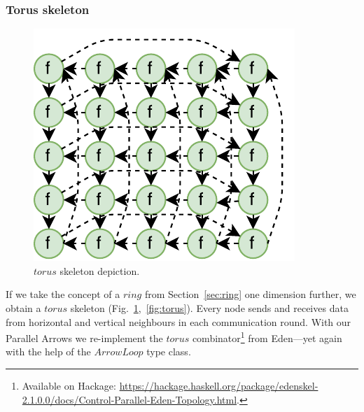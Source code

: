 \documentclass{jfp1}
\newcommand{\Conid}[1]{\mathit{#1}}
\newcommand{\Varid}[1]{\mathit{#1}}
\begin{document}
\subsubsection{Torus skeleton}\label{sec:torus}
\begin{figure}
	\includegraphics[scale=0.75]{images/torus}
	\caption{\ensuremath{\Varid{torus}} skeleton depiction.}
	\label{fig:ringTorusImg}
\end{figure}
If we take the concept of a \ensuremath{\Varid{ring}} from Section~\ref{sec:ring} one dimension further, we obtain a \ensuremath{\Varid{torus}} skeleton (Fig.~\ref{fig:ringTorusImg},~\ref{fig:torus}). Every node sends and receives data from horizontal and vertical neighbours in each communication round.
With our Parallel Arrows we re-implement the \ensuremath{\Varid{torus}} combinator\footnote{Available on Hackage: \url{https://hackage.haskell.org/package/edenskel-2.1.0.0/docs/Control-Parallel-Eden-Topology.html}.} from Eden---yet again with the help of the \ensuremath{\Conid{ArrowLoop}} type class.
\end{document}
